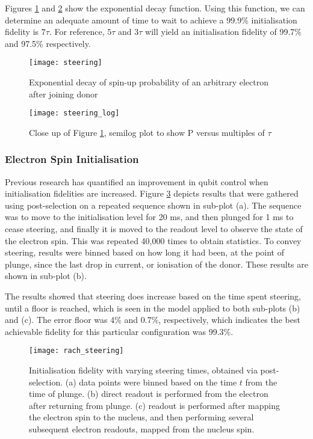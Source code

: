 		Figures \ref{fig::spin_steering} and \ref{fig::spin_steering_log} show the exponential decay function. Using this function, we can determine an adequate amount of time to wait to achieve a 99.9\% initialisation fidelity is $7 \tau$. For reference, $5 \tau$ and $3 \tau$ will yield an initialisation fidelity of 99.7\% and 97.5\% respectively.
		
		\begin{figure}[htbp!]
			\centering
			\texttt{[image: steering]}
			\caption{Exponential decay of spin-up probability of an arbitrary electron after joining donor}
			\label{fig::spin_steering}
		\end{figure}
		
		
		\begin{figure}[htbp!]
			\centering
			\texttt{[image: steering\_log]}
			\caption{Close up of Figure \ref{fig::spin_steering}, semilog plot to show P versus multiples of $\tau$}
			\label{fig::spin_steering_log}
		\end{figure}

\subsubsection{Electron Spin Initialisation}
\label{sec::spin_init}
	Previous research \cite{rachpon_thesis} has quantified an improvement in qubit control when initialisation fidelities are increased. Figure \ref{fig::rach_steering} depicts results that were gathered using post-selection on a repeated sequence shown in sub-plot (a). The sequence was to move to the initialisation level for 20 ms, and then plunged for 1 ms to cease steering, and finally it is moved to the readout level to observe the state of the electron spin. This was repeated 40,000 times to obtain statistics. To convey steering, results were binned based on how long it had been, at the point of plunge, since the last drop in current, or ionisation of the donor. These results are shown in sub-plot (b).
	
	The results showed that steering does increase based on the time spent steering, until a floor is reached, which is seen in the model applied to both sub-plots (b) and (c). The error floor was 4\% and 0.7\%, respectively, which indicates the best achievable fidelity for this particular configuration was 99.3\%.
	
	\begin{figure}[htbp!]
		\centering
		\texttt{[image: rach\_steering]}
		\caption[Initialisation fidelity with varying steering times, via post-selection.]{Initialisation fidelity with varying steering times, obtained via post-selection.
			(a) data points were binned based on the time $t$ from the time of plunge. 
			(b) direct readout is performed from the electron after returning from plunge.
			(c) readout is performed after mapping the electron spin to the nucleus, and then performing several subsequent electron readouts, mapped from the nucleus spin.
			\cite{rachpon_thesis}}
		\label{fig::rach_steering}
	\end{figure}
	
